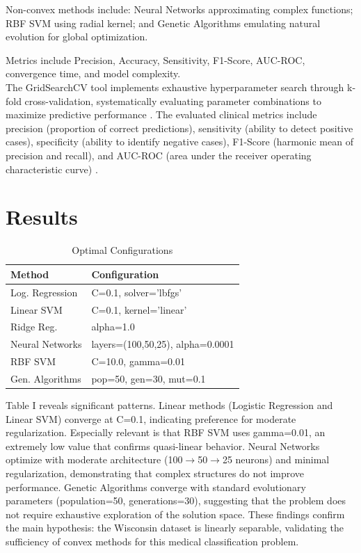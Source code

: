 \documentclass[conference]{IEEEtran}
\begin{document}
Non-convex methods \cite{nocedal2006} include: Neural Networks \cite{goodfellow2016} approximating complex functions; RBF SVM using radial kernel; and Genetic Algorithms \cite{holland1992} emulating natural evolution for global optimization.

Metrics include Precision, Accuracy, Sensitivity, F1-Score, AUC-ROC, convergence time, and model complexity.\\ 
The GridSearchCV tool implements exhaustive hyperparameter search through k-fold cross-validation, systematically evaluating parameter combinations to maximize predictive performance \cite{bergstra2012}. The evaluated clinical metrics include precision (proportion of correct predictions), sensitivity (ability to detect positive cases), specificity (ability to identify negative cases), F1-Score (harmonic mean of precision and recall), and AUC-ROC (area under the receiver operating characteristic curve) \cite{fawcett2006}.

\section{Results}

\begin{table}[htbp]
\caption{Optimal Configurations}
\begin{center}
\footnotesize
\begin{tabular}{lp{4.5cm}}
\toprule
Method & Configuration \\
\midrule
Log. Regression & C=0.1, solver='lbfgs' \\
Linear SVM & C=0.1, kernel='linear' \\
Ridge Reg. & alpha=1.0 \\
Neural Networks & layers=(100,50,25), alpha=0.0001 \\
RBF SVM & C=10.0, gamma=0.01 \\
Gen. Algorithms & pop=50, gen=30, mut=0.1 \\
\bottomrule
\end{tabular}
\label{tab1}
\end{center}
\end{table}

Table I reveals significant patterns. Linear methods (Logistic Regression and Linear SVM) converge at C=0.1, indicating preference for moderate regularization. Especially relevant is that RBF SVM uses gamma=0.01, an extremely low value that confirms quasi-linear behavior. Neural Networks optimize with moderate architecture (100$\rightarrow$50$\rightarrow$25 neurons) and minimal regularization, demonstrating that complex structures do not improve performance. Genetic Algorithms converge with standard evolutionary parameters (population=50, generations=30), suggesting that the problem does not require exhaustive exploration of the solution space. These findings confirm the main hypothesis: the Wisconsin dataset is linearly separable, validating the sufficiency of convex methods for this medical classification problem.
\end{document}
